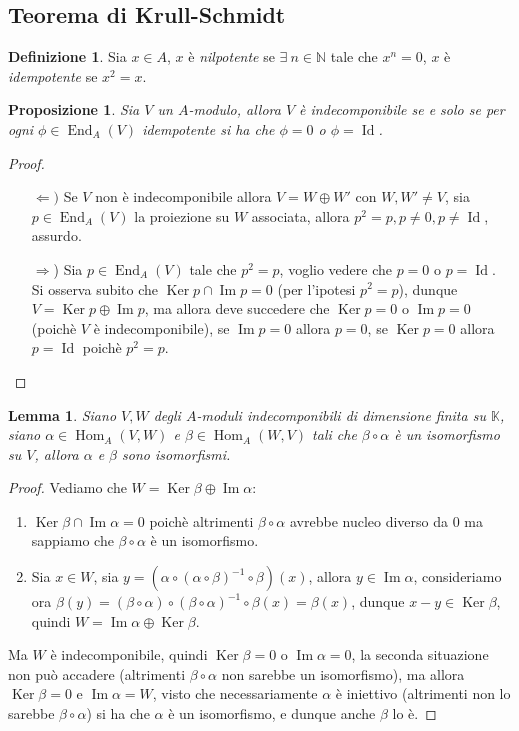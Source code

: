 \documentclass[11pt]{article}
\theoremstyle{plain}
\newtheorem{lemma}[thm]{Lemma}
\newtheorem{prop}[thm]{Proposizione}
\theoremstyle{definition}
\newtheorem{defn}{Definizione}[section]
\theoremstyle{remark}
\newcommand{\K}{\mathbb{K}}
\newcommand{\N}{\mathbb{N}}
\DeclareMathOperator{\Hom}{Hom}
\DeclareMathOperator{\End}{End}
\DeclareMathOperator{\Ker}{Ker}
\DeclareMathOperator{\Imm}{Im}
\DeclareMathOperator{\Id}{Id}
\begin{document}
\subsection{Teorema di Krull-Schmidt}
	\begin{defn}
		Sia $x\in A$, $x$ è \textit{nilpotente} se $\exists\ n\in \N$ tale che $x^n=0$, $x$ è \textit{idempotente} se $x^2=x$.
	\end{defn}
	\begin{prop}
		Sia $V$ un $A$-modulo, allora $V$ è indecomponibile se e solo se per ogni $\phi\in \End_A(V)$ idempotente si ha che $\phi=0$ o $\phi=\Id$.
	\end{prop}
	\begin{proof}
		\begin{enumerate}
			\item[$\Leftarrow)$] Se $V$ non è indecomponibile allora $V = W\oplus W'$ con $W,W'\neq V$, sia $p\in \End_A(V)$ la proiezione su $W$ associata, allora $p^2=p, p\neq 0, p\neq \Id$, assurdo.
			\item[$\Rightarrow$)]Sia $p\in \End_A(V)$ tale che $p^2=p$, voglio vedere che $p=0$ o $p=\Id$. Si osserva subito che $\Ker p \cap \Imm p = 0$ (per l'ipotesi $p^2=p$), dunque $V=\Ker p\oplus \Imm p$, ma allora deve succedere che $\Ker p = 0$ o $\Imm p = 0$ (poichè $V$ è indecomponibile), se $\Imm p = 0$ allora $p=0$, se $\Ker p=0$ allora $p=\Id$ poichè $p^2=p$.
		\end{enumerate}
	\end{proof}
	\begin{lemma}\label{comp_iso}
		Siano $V,W$ degli $A$-moduli indecomponibili di dimensione finita su $\K$, siano $\alpha\in \Hom_A(V,W)$ e $\beta\in \Hom_A(W,V)$ tali che $\beta\circ\alpha$ è un isomorfismo su $V$, allora $\alpha$ e $\beta$ sono isomorfismi.
	\end{lemma}
	\begin{proof}
		Vediamo che $W=\Ker\beta\oplus\Imm \alpha$:
		\begin{enumerate}
			\item $\Ker \beta\cap\Imm\alpha = 0$ poichè altrimenti $\beta\circ\alpha$ avrebbe nucleo diverso da $0$ ma sappiamo che $\beta\circ\alpha$ è un isomorfismo.
			\item Sia $x\in W$, sia $y=\left( \alpha\circ(\alpha\circ\beta)^{-1}\circ\beta \right)(x)$, allora $y\in \Imm \alpha$, consideriamo ora $\beta(y) = (\beta\circ\alpha)\circ(\beta\circ\alpha)^{-1}\circ\beta(x) = \beta(x)$, dunque $x-y\in \Ker \beta$, quindi $W=\Imm \alpha \oplus \Ker \beta$.
		\end{enumerate}
		Ma $W$ è indecomponibile, quindi $\Ker \beta = 0$ o $\Imm \alpha = 0$, la seconda situazione non può accadere (altrimenti $\beta\circ\alpha$ non sarebbe un isomorfismo), ma allora $\Ker \beta = 0$ e $\Imm \alpha = W$, visto che necessariamente $\alpha$ è iniettivo (altrimenti non lo sarebbe $\beta\circ\alpha$) si ha che $\alpha$ è un isomorfismo, e dunque anche $\beta$ lo è.
	\end{proof}
\end{document}
